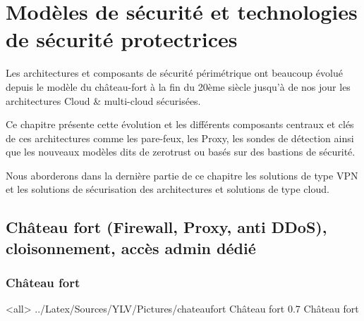 \section{Modèles de sécurité et technologies de sécurité protectrices}

Les architectures et composants de sécurité périmétrique ont beaucoup évolué depuis le modèle du château-fort à la fin du 20ème siècle jusqu'à de nos jour les architectures Cloud \& multi-cloud sécurisées.

Ce chapitre présente cette évolution et les différents composants centraux et clés de ces architectures comme les pare-feux, les Proxy, les sondes de détection ainsi que les nouveaux modèles dits de zerotrust ou basés sur des bastions de sécurité.

Nous aborderons dans la dernière partie de ce chapitre les solutions de type VPN et les solutions de sécurisation des architectures et solutions de type cloud.

\subsection{Château fort (Firewall, Proxy, anti DDoS), cloisonnement, accès admin dédié}
\subsubsection{Château fort}


\mode<all>{\picframe
{../Latex/Sources/YLV/Pictures/chateaufort}%
{Château fort} %
{0.7} %
{Château fort} %
}

